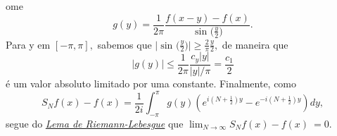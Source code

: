 \documentclass[measure_theory.tex]{subfiles}
\begin{document}
\begin{proof*}
	ome
	\[
		g(y) = \frac{1}{2\pi }\frac{f(x-y)-f(x)}{\sin^{}{\biggl(\frac{y}{2}\biggr)}}.
	\]
	Para y em \([-\pi , \pi ],\) sabemos que \(\biggl\vert \sin^{}{\biggl(\frac{y}{2}\biggr)} \biggr\vert \geq \frac{2}{\pi }\frac{y}{2},\) de maneira que
	\[
		|g(y)|\leq \frac{1}{2\pi }\frac{c_y|y|}{|y|/\pi } = \frac{c_{1}}{2}
	\]
	é um valor absoluto limitado por uma constante. Finalmente, como
	\[
		S_{N}f(x) - f(x) = \frac{1}{2i}\int_{-\pi }^{\pi }g(y)(e^{i(N+\frac{1}{2})y} - e^{-i(N+\frac{1}{2})y})dy,
	\]
	segue do \hyperlink{riemann_lebesgue}{\textit{Lema de Riemann-Lebesgue}} que \(\lim_{N\to \infty}S_{N}f(x) - f(x)\ = 0.\) \qedsymbol
\end{proof*}
\end{document}
